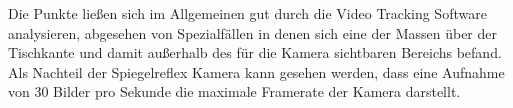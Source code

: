  Die Punkte ließen sich im Allgemeinen gut durch die Video Tracking Software analysieren, abgesehen von Spezialfällen in denen sich eine der Massen über der Tischkante und damit außerhalb des für die Kamera sichtbaren Bereichs befand.
Als Nachteil der Spiegelreflex Kamera kann gesehen werden, dass eine Aufnahme von 30 Bilder pro Sekunde die maximale Framerate der Kamera darstellt.


